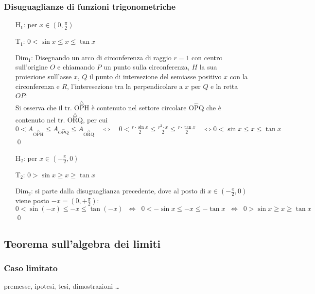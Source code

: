 \documentclass[a4paper]{article}
\begin{document}
\subsubsection*{Disuguaglianze di funzioni trigonometriche}
\begin{itemize}
	\item[H\(_1\): ] per \(x \in \left( 0, \displaystyle \frac{\pi}{2} \right)\)
	\item[T\(_1\): ] \(0 < \sin x \leq x \leq \tan x\)
	\item[Dim\(_1\): ] Disegnando un arco di circonferenza di raggio \(r = 1\) con centro sull'origine \(O\) e chiamando \(P\) un punto sulla circonferenza, \(H\) la sua proiezione sull'asse \(x\),
	\(Q\) il punto di intersezione del semiasse positivo \(x\) con la circonferenza e \(R\), l'interesezione tra la perpendicolare a \(x\) per \(Q\) e la retta \(OP\): \\
	Si osserva che il tr. \(\overset{\triangle}{\text{OPH}}\) è contenuto nel settore circolare \(\overset{\smallfrown}{\text{OPQ}}\) che è contenuto nel tr. \(\overset{\triangle}{\text{ORQ}}\), per cui
	\(0 < A_{\overset{\triangle}{\text{OPH}}} \leq A_{\overset{\smallfrown}{\text{OPQ}}} \leq A_{\overset{\triangle}{\text{ORQ}}} \quad \Leftrightarrow
	\quad 0 < \frac{r \cdot \sin x}{2} \leq \frac{r ^ 2 \cdot x }{2} \leq \frac{r \cdot \tan x}{2} \quad \Leftrightarrow 0 < \sin x \leq x \leq \tan x \) \qed
	
	\item[H\(_2\): ] per \(x \in \left( \displaystyle - \frac{\pi}{2}, 0 \right)\)
	\item[T\(_2\): ] \(0 > \sin x \geq x \geq \tan x\)
	\item[Dim\(_2\): ] si parte dalla disuguaglianza precedente, dove al posto di \(x \in \left( \displaystyle - \frac{\pi}{2}, 0 \right)\) viene posto \(-x = \left( 0, \displaystyle + \frac{\pi}{2} \right)\): \\
	\(0 < \sin \left( -x \right) \leq -x \leq \tan \left( -x \right) \;\; \Leftrightarrow \;\; 0 < -\sin x \leq -x \leq -\tan x \;\; \Leftrightarrow \;\; 0 > \sin x \geq x \geq \tan x\) \qed
\end{itemize}

\newpage


\subsection{Teorema sull'algebra dei limiti}
\subsubsection*{Caso limitato}
premesse, ipotesi, tesi, dimostrazioni \dots
\end{document}
